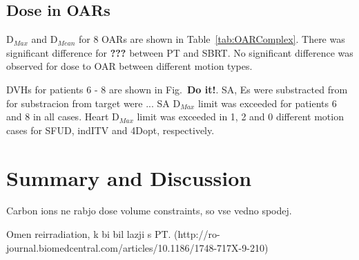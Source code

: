 \documentclass[type=dr, dr=rernat, accentcolor=tud7b,colorbacktitle, bigchapter, openright, twoside, 12pt ]{tudthesis}
\begin{document}


\subsection{Dose in OARs}

D$_{Max}$ and D$_{Mean}$ for 8 OARs are shown in Table~\ref{tab:OARComplex}. There was significant difference for \textbf{???} between PT and SBRT. No significant difference was observed for dose to OAR between different motion types.

DVHs for patients 6 - 8 are shown in Fig.~\textbf{Do it!}. SA, Es were substracted from for substracion from target were ...
SA D$_{Max}$ limit was exceeded for patients 6 and 8 in all cases. Heart D$_{Max}$ limit was exceeded in 1, 2 and 0 different motion cases for SFUD, indITV and 4Dopt, respectively.






\section{Summary and Discussion}


Carbon ions ne rabjo dose volume constraints, so vse vedno spodej.

Omen reirradiation, k bi bil lazji s PT. (http://ro-journal.biomedcentral.com/articles/10.1186/1748-717X-9-210)




{}
% 
\end{document}
